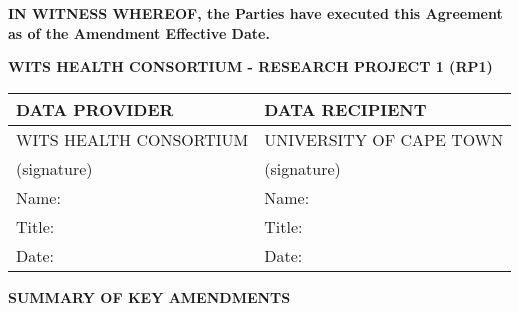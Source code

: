 \documentclass[12pt,letterpaper]{article}
\newcommand{\added}[1]{\textcolor{addcolor}{#1}}
\begin{document}
\vspace{0.5cm}

\textbf{IN WITNESS WHEREOF, the Parties have executed this Agreement as of the \added{Amendment} Effective Date.}

\begin{center}
\textbf{WITS HEALTH CONSORTIUM - RESEARCH PROJECT 1 (RP1)}
\end{center}

\begin{tabular}{|p{}|p{}|}
\hline
\textbf{DATA PROVIDER} & \textbf{DATA RECIPIENT} \\
\hline
WITS HEALTH CONSORTIUM & UNIVERSITY OF CAPE TOWN \\
\hline
(signature) & (signature) \\
\hline
Name: & Name: \\
\hline
Title: & Title: \\
\hline
Date: & Date: \\
\hline
\end{tabular}

\vspace{1cm}

\begin{center}
\textbf{\Large SUMMARY OF KEY AMENDMENTS}
\end{center}
\end{document}
